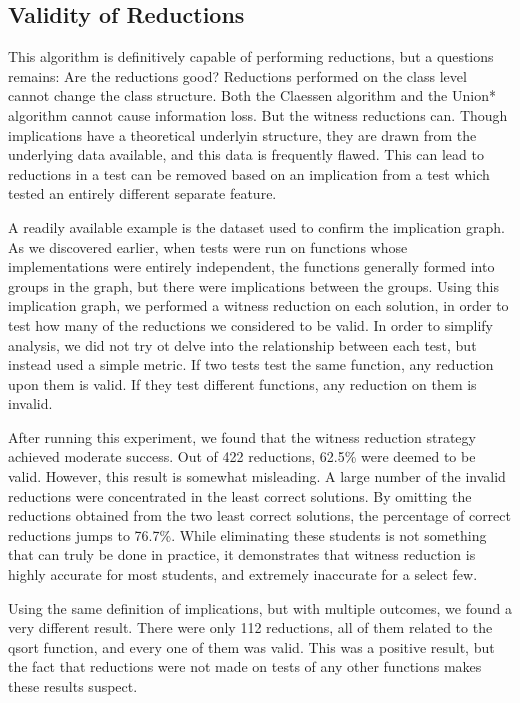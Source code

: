 \documentclass[11pt]{article}
\begin{document}
\subsection{Validity of Reductions}

This algorithm is definitively  capable of performing reductions, but a questions remains: Are the reductions good? Reductions performed on the class level cannot change the class structure. Both the Claessen algorithm and the Union* algorithm cannot cause information loss. But the witness reductions can. Though implications have a theoretical underlyin structure, they are drawn from the underlying data available, and this data is frequently flawed. This can lead to reductions in a test can be removed based on an implication from a test which tested an entirely different separate feature.

A readily available example is the dataset used to confirm the implication graph. As we discovered earlier, when tests were run on functions whose implementations were entirely independent, the functions generally formed into groups in the  graph, but there were implications between the groups. Using this implication graph, we performed a witness reduction on each solution, in order to test how many of the reductions we considered to be valid. In order to simplify analysis, we did not try ot delve into the relationship between each test, but instead used a simple metric. If two tests test the same function, any reduction upon them is valid. If they test different  functions, any reduction on them is invalid.

\begin{figure}


\end{figure}


After running this experiment, we found that the witness reduction strategy achieved moderate success. Out of 422 reductions, 62.5\% were deemed to be valid. However, this result is somewhat misleading. A large number of the invalid reductions were concentrated in the least correct solutions. By omitting the reductions obtained from the two least correct solutions, the percentage of correct reductions jumps to 76.7\%. While eliminating these students is not something that can truly be done in practice, it demonstrates that witness reduction is highly accurate for most students, and extremely inaccurate for a select few.

Using the same definition of implications, but with multiple outcomes, we found a very different result. There were only 112 reductions, all of them related to the qsort function, and every one of them was valid. This was a positive result, but the fact that reductions were not made on tests of any other functions makes these results suspect.
\end{document}
